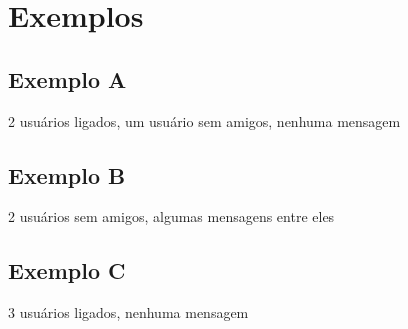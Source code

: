 \documentclass[a4paper,12pt]{article}
\begin{document}
\section{Exemplos}

\subsection{Exemplo A}
2 usuários ligados, um usuário sem amigos, nenhuma mensagem
\ifpdf
\else
\fi
\subsection{Exemplo B}
2 usuários sem amigos, algumas mensagens entre eles
\ifpdf
\else
\fi
\subsection{Exemplo C}
3 usuários ligados, nenhuma mensagem
\ifpdf
\else
\fi
\end{document}
